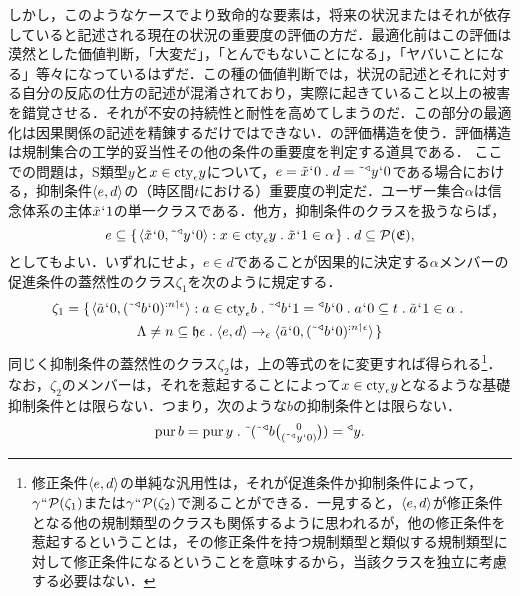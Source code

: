 しかし，このようなケースでより致命的な要素は，将来の状況またはそれが依存していると記述される現在の状況の重要度の評価の方だ．最適化前はこの評価は漠然とした価値判断，「大変だ」，「とんでもないことになる」，「ヤバいことになる」等々になっているはずだ．この種の価値判断では，状況の記述とそれに対する自分の反応の仕方の記述が混淆されており，実際に起きていること以上の被害を錯覚させる．それが不安の持続性と耐性を高めてしまうのだ．この部分の最適化は因果関係の記述を精錬するだけではできない．の評価構造を使う．評価構造は規制集合の工学的妥当性その他の条件の重要度を判定する道具である．
ここでの問題は，S類型$y$と$ x\in\mathrm{cty}_{\epsilon}y $について，$ e = \tilde{x}\fap 0\con{1}d = \tildel{\trgl{y}}\fap 0 $である場合における，抑制条件$\langle e,d \rangle$の（時区間$t$における）重要度の判定だ．ユーザー集合$\alpha$は信念体系の主体$ \tilde{x}{\mspace{1mu}{`}\mspace{1mu}} 1 $の単一クラスである．他方，抑制条件のクラスを扱うならば，
\[
    e \subseteq \classab{\orp{\tilde{x}\fap 0,\tildel{\trgl{y}}\fap 0}:x\in\cty{\epsilon}y\con{1}\tilde{x}\fap 1 \in\alpha}\con{1}
    d \subseteq \mathcal{P}(\mathfrak{E}),
\]
としてもよい．いずれにせよ，$ e\in d $であることが因果的に決定する$ \alpha $メンバーの促進条件の蓋然性のクラス$\zeta_1$を次のように規定する．
\begin{multline*}
    \zeta_1 = \classab{\orp{\tilde{a}\fap 0,\prob{(\tildel{\trgl{b}}\fap 0)}{n\uphl\epsilon}}:
    a\in\cty{\epsilon}b\con{1}\tildel{\trgl{b}}\fap 1 = \trgl{b}\fap 0\con{1}
    a\fap 0\subseteq t\con{1}\tilde{a}\fap 1 \in \alpha\con{1}\\
    \Lambda\neq n\subseteq \indx{\epsilon}\con{1}
    \orp{e,d}\to_{\epsilon}\orp{\tilde{a}\fap 0,\prob{(\tildel{\trgl{b}}\fap 0)}{n\uphl\epsilon}}
    }
\end{multline*}
同じく抑制条件の蓋然性のクラス$\zeta_2$は，上の等式のをに変更すれば得られる\footnote{
    修正条件$ \langle e,d \rangle $の単純な汎用性は，それが促進条件か抑制条件によって，$\gamma{\mspace{1mu}{``}\mspace{1mu}}\mathcal{P}(\zeta_1)$または$\gamma{\mspace{1mu}{``}\mspace{1mu}}\mathcal{P}(\zeta_2)$で測ることができる．一見すると，$\langle e,d \rangle$が修正条件となる他の規制類型のクラスも関係するように思われるが，他の修正条件を惹起するということは，その修正条件を持つ規制類型と類似する規制類型に対して修正条件になるということを意味するから，当該クラスを独立に考慮する必要はない．
}．
なお，$\zeta_2$のメンバーは，それを惹起することによって$x\in\mathrm{cty}_{\epsilon}y$となるような基礎抑制条件とは限らない．つまり，次のような$b$の抑制条件とは限らない．
\[
    \mathrm{pur}\,b = \mathrm{pur}\,y\con{1}\tildel{(\tildel{\trgl{b}}\tbinom{0}{(\tildel{\trgl{y}}\fap 0)})} = \trgl{y}.
\]
